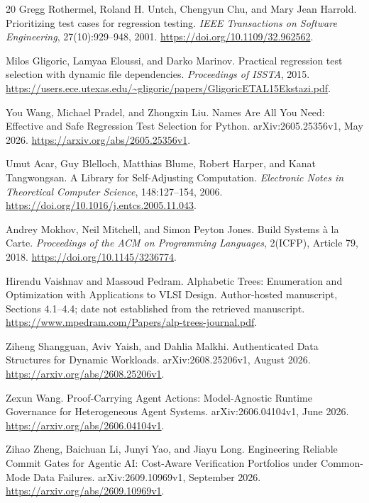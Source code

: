 \begin{thebibliography}{20}
 Gregg Rothermel, Roland H. Untch, Chengyun Chu, and Mary Jean Harrold.
\newblock Prioritizing test cases for regression testing.
\newblock \emph{IEEE Transactions on Software Engineering}, 27(10):929--948, 2001.
\newblock \url{https://doi.org/10.1109/32.962562}.

 Milos Gligoric, Lamyaa Eloussi, and Darko Marinov.
\newblock Practical regression test selection with dynamic file dependencies.
\newblock \emph{Proceedings of ISSTA}, 2015.
\newblock \url{https://users.ece.utexas.edu/~gligoric/papers/GligoricETAL15Ekstazi.pdf}.

 You Wang, Michael Pradel, and Zhongxin Liu.
\newblock Names Are All You Need: Effective and Safe Regression Test Selection for Python.
\newblock arXiv:2605.25356v1, May 2026.
\newblock \url{https://arxiv.org/abs/2605.25356v1}.

 Umut Acar, Guy Blelloch, Matthias Blume, Robert Harper, and Kanat Tangwongsan.
\newblock A Library for Self-Adjusting Computation.
\newblock \emph{Electronic Notes in Theoretical Computer Science}, 148:127--154, 2006.
\newblock \url{https://doi.org/10.1016/j.entcs.2005.11.043}.

 Andrey Mokhov, Neil Mitchell, and Simon Peyton Jones.
\newblock Build Systems \`a la Carte.
\newblock \emph{Proceedings of the ACM on Programming Languages}, 2(ICFP), Article 79, 2018.
\newblock \url{https://doi.org/10.1145/3236774}.

 Hirendu Vaishnav and Massoud Pedram.
\newblock Alphabetic Trees: Enumeration and Optimization with Applications to VLSI Design.
\newblock Author-hosted manuscript, Sections 4.1--4.4; date not established from the retrieved manuscript.
\newblock \url{https://www.mpedram.com/Papers/alp-trees-journal.pdf}.

 Ziheng Shangguan, Aviv Yaish, and Dahlia Malkhi.
\newblock Authenticated Data Structures for Dynamic Workloads.
\newblock arXiv:2608.25206v1, August 2026.
\newblock \url{https://arxiv.org/abs/2608.25206v1}.

 Zexun Wang.
\newblock Proof-Carrying Agent Actions: Model-Agnostic Runtime Governance for Heterogeneous Agent Systems.
\newblock arXiv:2606.04104v1, June 2026.
\newblock \url{https://arxiv.org/abs/2606.04104v1}.

 Zihao Zheng, Baichuan Li, Junyi Yao, and Jiayu Long.
\newblock Engineering Reliable Commit Gates for Agentic AI: Cost-Aware Verification Portfolios under Common-Mode Data Failures.
\newblock arXiv:2609.10969v1, September 2026.
\newblock \url{https://arxiv.org/abs/2609.10969v1}.


\end{thebibliography}
